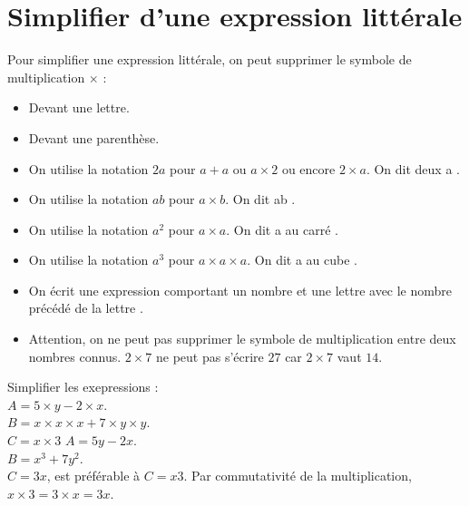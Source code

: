 \section{Simplifier d'une expression littérale}

\begin{convention}
    Pour simplifier une expression littérale, on peut supprimer le symbole de multiplication \og $\times$ \fg :
    \begin{itemize}
        \item Devant une lettre.
        \item Devant une parenthèse.
    \end{itemize}
\end{convention}
 
\begin{convention}
   \begin{itemize}
      \item On utilise la notation $2a$ pour $a+a$ ou $a\times2$ ou encore $2\times a$. On dit \og deux a \fg.
      \item On utilise la notation $ab$ pour $a\times b$. On dit \og ab \fg.
      \item On utilise la notation $a^2$ pour $a\times a$. On dit \og a au carré \fg.
      \item On utilise la notation $a^3$ pour $a\times a\times a$. On dit \og a au cube \fg. \\ [-8mm]
   \end{itemize}
\end{convention}

\begin{remarques}
    \begin{itemize}
        \item On écrit une expression comportant un nombre et une \og lettre \fg{} avec le nombre précédé de la \og lettre \fg.
        \item Attention, on ne peut pas supprimer le symbole de multiplication entre deux nombres connus. $2\times 7$ ne peut pas s'\'ecrire $27$ car $2\times 7$ vaut $14$.
    \end{itemize}
\end{remarques}

\begin{exemple}[0.5]
   Simplifier les exepressions : \\
   $A =5\times y-2\times x$. \\
   $B =x\times x \times x + 7\times y\times y$. \\
   $C =x\times3$
   \correction
      $A =5y-2x$. \\
      $B =x^3+7y^2$. \\
      $C =3x$, est préférable à $C=x3$. Par commutativité de la multiplication, $x\times3 =3\times x =3x$.
\end{exemple}